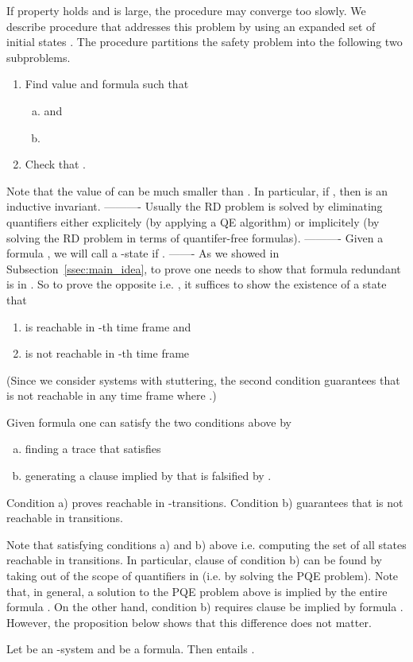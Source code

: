 If property  holds and  is large, the \FB procedure may
converge too slowly.  We describe procedure \PP that addresses this
problem by using an expanded set of initial states . The
\PP procedure partitions the safety problem into the following two
subproblems.
\begin{enumerate}
\item Find value  and formula  such that 
\begin{enumerate}[a)]
\item {} and 
\item  
\end{enumerate}
\item Check that .
\end{enumerate}
Note that the value of  can be much smaller than . In
particular, if , then  is an inductive invariant.
----------
Usually the RD problem is solved by
eliminating quantifiers either explicitely (by applying a QE
algorithm) or implicitely (by solving the RD problem in terms of
quantifer-free formulas). 
----------
 Given a formula , we will call  a -state if
.
-------
As we showed in Subsection~\ref{ssec:main_idea}, to prove
 one needs to show that formula  redundant
is in . So to
prove the opposite i.e.  , it suffices to show the
existence of a state  that
\begin{enumerate}
\item is reachable in -th time frame and 
\item is not reachable in -th time frame
\end{enumerate}
(Since we consider systems with stuttering, the second condition
guarantees that  is not reachable in any time frame  where
.)

Given formula  one can satisfy
the two conditions above by 
\begin{enumerate}[a)]
\item finding a trace  that satisfies 
\item generating a clause  implied by  that is falsified by .
\end{enumerate}
Condition a) proves  reachable in -transitions.
Condition b) guarantees that  is not reachable in
 transitions. 

Note that satisfying conditions a) and b) above  i.e. computing the set of all states reachable
in  transitions. In particular, clause  of condition b) can be
found by taking  out of the scope of quantifiers in
 (i.e. by solving
the PQE problem). Note that, in general, a solution to the PQE problem
above is implied by the entire formula . On the other hand, condition b) requires clause  be
implied by formula . However, the proposition below shows that this difference
does not matter.
\begin{proposition}
\label{prop:dfs}
Let \KS be an -system and  be a formula. Then  entails .
\end{proposition}


